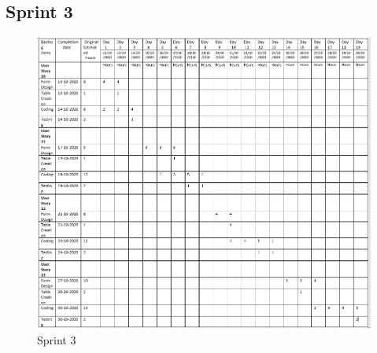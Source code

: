 \documentclass[a4paper,12pt]{report}
\begin{document}
\subsection {Sprint 3}
\begin{figure}[bph]
	\centering
	\includegraphics[width=0.9\linewidth]{img/sprint/sp3a}
	\caption{Sprint 3}
\end{figure}
\pagebreak
\end{document}
